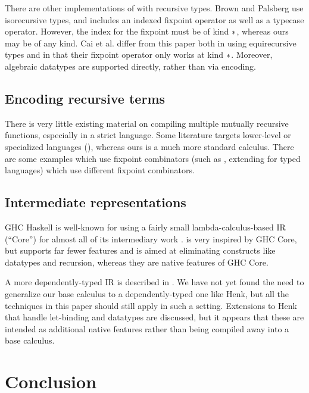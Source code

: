 There are other implementations of \FOM{} with recursive types.
Brown and Palsberg \cite{Brown2017} use isorecursive types, and includes an indexed fixpoint
operator as well as a typecase operator. However, the index for the fixpoint
must be of kind $\operatorname{\ast}$, whereas ours may be of any
kind. Cai et al. \cite{cai-giarrusso-ostermann} differ from this paper both in using equirecursive
types and in that their fixpoint operator only works at kind $\operatorname{\ast}$. Moreover,
algebraic datatypes are supported directly, rather than via encoding.

\subsection{Encoding recursive terms}

There is very little existing material on compiling multiple mutually recursive
functions, especially in a strict language. Some literature targets
lower-level or specialized languages
(\cite{hirschowitz2003compilation,syme2006initializing,nordlander2008unrestricted}),
whereas ours is a much more standard calculus. There
are some examples which use fixpoint combinators (such as
\cite{olegfixpoints}, extending \cite{goldberg2005variadic} for typed languages)
which use different fixpoint combinators.

\subsection{Intermediate representations}

GHC Haskell is well-known for using a fairly small lambda-calculus-based IR
(``Core'') for almost all of its intermediary work \cite{jones1998transformation}. \FIR{} is very inspired by
GHC Core, but supports far fewer features and is aimed at eliminating constructs
like datatypes and recursion, whereas they are native features of GHC Core.

A more dependently-typed IR is described in \cite{Henk}. We have
not yet found the need to generalize our base calculus to a dependently-typed
one like Henk, but all the techniques in this paper
should still apply in such a setting. Extensions to Henk that handle let-binding and datatypes are
discussed, but it appears that these are intended as additional native features rather than
being compiled away into a base calculus.

\section{Conclusion}

